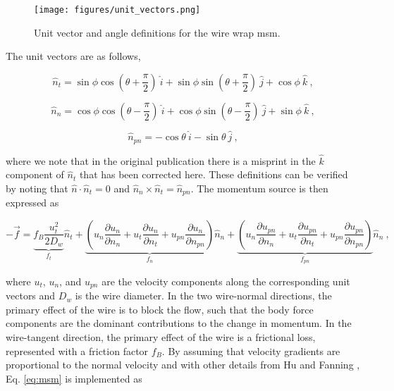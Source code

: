 \documentclass[3p,,preprint,11pt]{elsarticle}
\begin{document}
\begin{figure}[!htb]                                                                                                  
\centering
\texttt{[image: figures/unit\_vectors.png]}
\caption{Unit vector and angle definitions for the wire wrap \gls{msm}.}
\label{fig:unit_vectors}
\end{figure}

The unit vectors are as follows,

\begin{equation}
\label{eq:n_t}
\hat{n}_t=\sin{\phi}\cos{\left(\theta+\frac{\pi}{2}\right)}\ \hat{i}+\sin{\phi}\sin{\left(\theta+\frac{\pi}{2}\right)}\ \hat{j}+\cos{\phi}\ \hat{k}\ ,
\end{equation}

\begin{equation}
\hat{n}_n=\cos{\phi}\cos{\left(\theta-\frac{\pi}{2}\right)}\ \hat{i}+\cos{\phi}\sin{\left(\theta-\frac{\pi}{2}\right)}\ \hat{j}+\sin{\phi}\ \hat{k}\ ,
\end{equation}

\begin{equation}
\hat{n}_{pn}=-\cos{\theta}\ \hat{i}-\sin{\theta}\ \hat{j}\ ,
\end{equation}

\noindent where we note that in the original publication \cite{hu2013} there is a misprint in the $\hat{k}$ component of $\hat{n}_t$ that has been corrected here. These definitions can be verified by noting that $\hat{n}\cdot\hat{n}_t=0$ and $\hat{n}_n\times\hat{n}_t=\hat{n}_{pn}$. The momentum source is then expressed as

\begin{equation}
\label{eq:msm}
-\vec{f}= \underbrace{f_{B}\frac{u_t^2}{2D_w}}_{f_t}\hat{n}_t+\underbrace{\left(u_n\frac{\partial u_n}{\partial n_n}+u_t\frac{\partial u_n}{\partial n_t}+u_{pn}\frac{\partial u_n}{\partial n_{pn}}\right)}_{f_n}\hat{n}_n+\underbrace{\left(u_n\frac{\partial u_{pn}}{\partial n_n}+u_t\frac{\partial u_{pn}}{\partial n_t}+u_{pn}\frac{\partial u_{pn}}{\partial n_{pn}}\right)}_{f_{pn}}\hat{n}_n\ ,
\end{equation}

where $u_t$, $u_n$, and $u_{pn}$ are the velocity components along the corresponding unit vectors and $D_w$ is the wire diameter.
In the two wire-normal directions, the primary effect of the wire is to block the flow, such that
the body force components are the dominant contributions to the change in momentum. 
In the wire-tangent direction, the primary effect of the wire is a frictional loss, represented with a friction factor $f_B$. By assuming that velocity gradients are proportional to the normal velocity and with other details from Hu and Fanning \cite{hu2013}, Eq. \eqref{eq:msm} is implemented as
\end{document}
